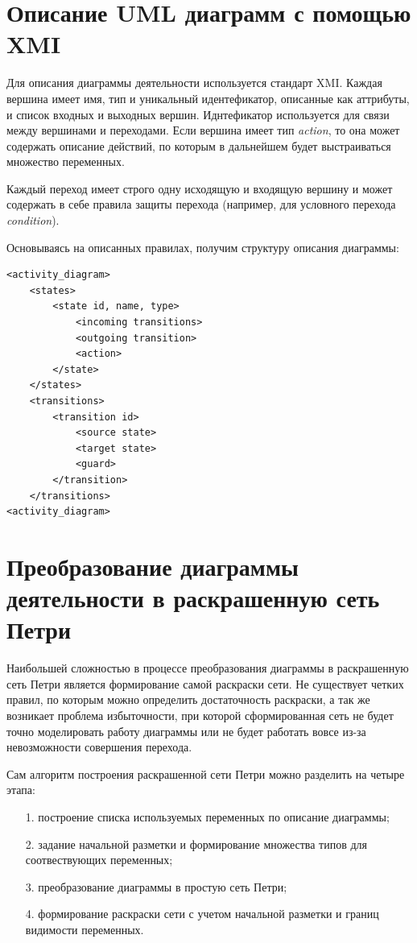 
\section{Описание UML диаграмм с помощью XMI}

Для описания диаграммы деятельности используется стандарт XMI. Каждая вершина имеет имя, тип и уникальный идентефикатор, описанные как аттрибуты, и список входных и выходных вершин. Иднтефикатор используется для связи между вершинами и переходами. Если вершина имеет тип \textit{action}, то она может содержать описание действий, по которым в дальнейшем будет выстраиваться множество переменных.

Каждый переход имеет строго одну исходящую и входящую вершину и может содержать в себе правила защиты перехода (например, для условного перехода \textit{condition}).

Основываясь на описанных правилах, получим структуру описания диаграммы:

\begin{lstlisting}[style=grammar,basicstyle=\small,caption={Структура XMI файла}]
<activity_diagram>
	<states>
		<state id, name, type>
			<incoming transitions>
			<outgoing transition>
			<action>
		</state>
	</states>
	<transitions>
		<transition id>
			<source state>
			<target state>
			<guard>
		</transition>
	</transitions>
<activity_diagram>
\end{lstlisting}

\section{Преобразование диаграммы деятельности в раскрашенную сеть Петри}

Наибольшей сложностью в процессе преобразования диаграммы в раскрашенную сеть Петри является формирование самой раскраски сети. Не существует четких правил, по которым можно определить достаточность раскраски, а так же возникает проблема избыточности, при которой сформированная сеть не будет точно моделировать работу диаграммы или не будет работать вовсе из-за невозможности совершения перехода.

Сам алгоритм построения раскрашенной сети Петри можно разделить на четыре этапа:

\begin{enumerate}
\item[1.] построение списка используемых переменных по описание диаграммы;
\item[2.] задание начальной разметки и формирование множества типов для соотвествующих переменных;
\item[3.] преобразование диаграммы в простую сеть Петри;
\item[4.] формирование раскраски сети с учетом начальной разметки и границ видимости переменных.
\end{enumerate}

